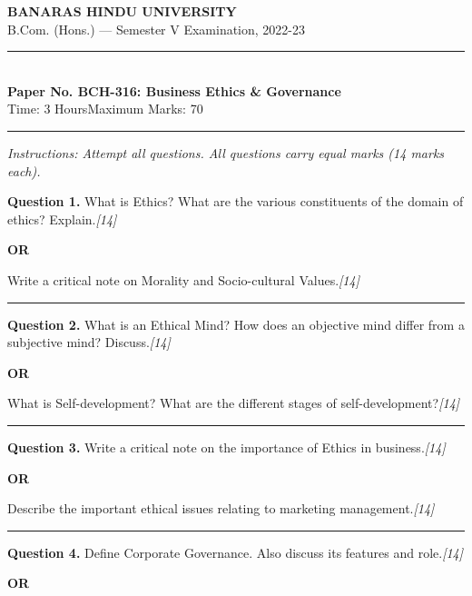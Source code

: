 \documentclass[11pt,a4paper]{article}
\newcommand{\pts}[1]{\hfill   \textit{[#1]}}
\begin{document}
\begin{center}
  {\large\bfseries BANARAS HINDU UNIVERSITY}\\[2pt]
  {\normalsize B.Com. (Hons.) --- Semester V Examination, 2022-23}\\[6pt]
  \rule{0.8\linewidth}{0.5pt}\\[6pt]
  {\large\bfseries Paper No. BCH-316: Business Ethics \& Governance}\\[4pt]
  {\normalsize Time: 3 Hours\hfill Maximum Marks: 70}
\end{center}

\rule{\linewidth}{0.4pt}

\smallskip



\noindent   \textit{Instructions: Attempt all questions. All questions carry equal marks (14 marks each).}

\bigskip




\noindent   \textbf{Question 1.}
What is Ethics? What are the various constituents of the domain of ethics? Explain.\pts{14}

\centerline{   \textbf{OR}}

Write a critical note on Morality and Socio-cultural Values.\pts{14}

\medskip\rule{\linewidth}{0.2pt}




\noindent   \textbf{Question 2.}
What is an Ethical Mind? How does an objective mind differ from a subjective mind? Discuss.\pts{14}

\centerline{   \textbf{OR}}

What is Self-development? What are the different stages of self-development?\pts{14}

\medskip\rule{\linewidth}{0.2pt}




\noindent   \textbf{Question 3.}
Write a critical note on the importance of Ethics in business.\pts{14}

\centerline{   \textbf{OR}}

Describe the important ethical issues relating to marketing management.\pts{14}

\medskip\rule{\linewidth}{0.2pt}




\noindent   \textbf{Question 4.}
Define Corporate Governance. Also discuss its features and role.\pts{14}

\centerline{   \textbf{OR}}
\end{document}
